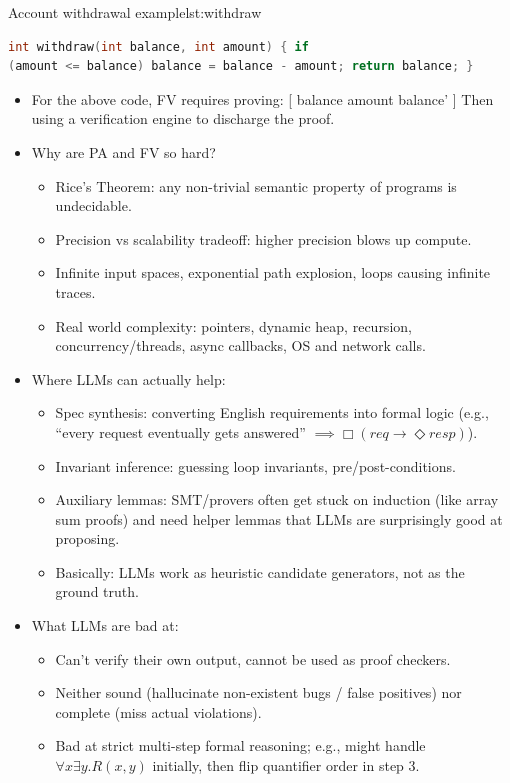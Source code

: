 \begin{ppprogram}{Account withdrawal example}{lst:withdraw}
\begin{lstlisting}[language=C] int withdraw(int balance, int amount) { if
(amount <= balance) balance = balance - amount; return balance; }
\end{lstlisting} \end{ppprogram}

\begin{itemize} \item For the above code, FV requires proving: [ balance 
\land amount  \implies balance'  ] Then using a verification engine to
discharge the proof.

\item Why are PA and FV so hard?
\begin{itemize}
    \item Rice's Theorem: any non-trivial semantic property of programs is undecidable.
    \item Precision vs scalability tradeoff: higher precision blows up compute.
    \item Infinite input spaces, exponential path explosion, loops causing infinite traces.
    \item Real world complexity: pointers, dynamic heap, recursion, concurrency/threads, async callbacks, OS and network calls.
\end{itemize}

\item Where LLMs can actually help:
\begin{itemize}
    \item Spec synthesis: converting English requirements into formal logic (e.g., ``every request eventually gets answered'' $\implies \Box(req \to \Diamond resp)$).
    \item Invariant inference: guessing loop invariants, pre/post-conditions.
    \item Auxiliary lemmas: SMT/provers often get stuck on induction (like array sum proofs) and need helper lemmas that LLMs are surprisingly good at proposing.
    \item Basically: LLMs work as heuristic candidate generators, not as the ground truth.
\end{itemize}

\item What LLMs are bad at:
\begin{itemize}
    \item Can't verify their own output, cannot be used as proof checkers.
    \item Neither sound (hallucinate non-existent bugs / false positives) nor complete (miss actual violations).
    \item Bad at strict multi-step formal reasoning; e.g., might handle $\forall x \exists y . R(x,y)$ initially, then flip quantifier order in step 3.
\end{itemize}


\end{itemize}
